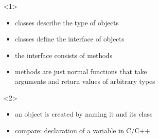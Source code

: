 \documentclass{slides}
\begin{document}
\begin{frame}

  \begin{center}
  \end{center}

  \begin{onlyenv}<1>
    \begin{itemize}
    \item classes describe the type of objects
    \item classes define the \alert{interface} of objects
    \item the interface consists of \alert{methods}
    \item methods are just normal functions that take\\
      arguments and return values of arbitrary types
    \end{itemize}
  \end{onlyenv}

  \begin{onlyenv}<2>
    \begin{itemize}
    \item an object is created by naming it and its class
    \item compare: declaration of a variable in C/C++
    \end{itemize}
  \end{onlyenv}
\end{frame}
\end{document}
